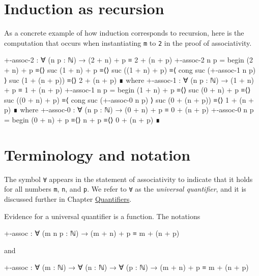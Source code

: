 \hypertarget{induction-as-recursion}{%
\section{Induction as recursion}\label{induction-as-recursion}}

As a concrete example of how induction corresponds to recursion, here is
the computation that occurs when instantiating \texttt{m} to \texttt{2}
in the proof of associativity.

\begin{fence}
\begin{code}
+-assoc-2 : ∀ (n p : ℕ) → (2 + n) + p ≡ 2 + (n + p)
+-assoc-2 n p =
  begin
    (2 + n) + p
  ≡⟨⟩
    suc (1 + n) + p
  ≡⟨⟩
    suc ((1 + n) + p)
  ≡⟨ cong suc (+-assoc-1 n p) ⟩
    suc (1 + (n + p))
  ≡⟨⟩
    2 + (n + p)
  ∎
  where
  +-assoc-1 : ∀ (n p : ℕ) → (1 + n) + p ≡ 1 + (n + p)
  +-assoc-1 n p =
    begin
      (1 + n) + p
    ≡⟨⟩
      suc (0 + n) + p
    ≡⟨⟩
      suc ((0 + n) + p)
    ≡⟨ cong suc (+-assoc-0 n p) ⟩
      suc (0 + (n + p))
    ≡⟨⟩
      1 + (n + p)
    ∎
    where
    +-assoc-0 : ∀ (n p : ℕ) → (0 + n) + p ≡ 0 + (n + p)
    +-assoc-0 n p =
      begin
        (0 + n) + p
      ≡⟨⟩
        n + p
      ≡⟨⟩
        0 + (n + p)
      ∎
\end{code}
\end{fence}

\hypertarget{terminology-and-notation}{%
\section{Terminology and notation}\label{terminology-and-notation}}

The symbol \texttt{∀} appears in the statement of associativity to
indicate that it holds for all numbers \texttt{m}, \texttt{n}, and
\texttt{p}. We refer to \texttt{∀} as the \emph{universal quantifier},
and it is discussed further in Chapter
\protect\hyperlink{Quantifiers}{Quantifiers}.

Evidence for a universal quantifier is a function. The notations

\begin{myDisplay}
+-assoc : ∀ (m n p : ℕ) → (m + n) + p ≡ m + (n + p)
\end{myDisplay}

and

\begin{myDisplay}
+-assoc : ∀ (m : ℕ) → ∀ (n : ℕ) → ∀ (p : ℕ) → (m + n) + p ≡ m + (n + p)
\end{myDisplay}

